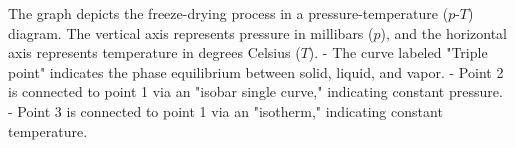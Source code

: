 The graph depicts the freeze-drying process in a pressure-temperature (\(p\)-\(T\)) diagram. The vertical axis represents pressure in millibars (\(p\)), and the horizontal axis represents temperature in degrees Celsius (\(T\)).  
- The curve labeled "Triple point" indicates the phase equilibrium between solid, liquid, and vapor.  
- Point 2 is connected to point 1 via an "isobar single curve," indicating constant pressure.  
- Point 3 is connected to point 1 via an "isotherm," indicating constant temperature.